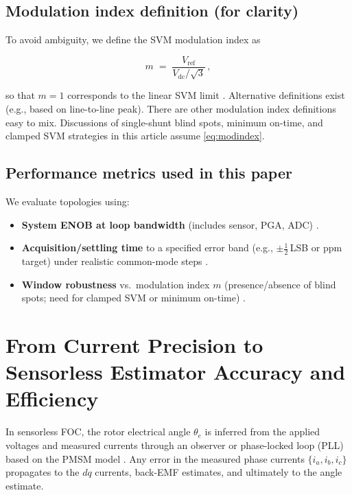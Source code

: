 \documentclass[conference]{IEEEtran}
\begin{document}
\subsection{Modulation index definition (for clarity)}

To avoid ambiguity, we define the SVM modulation index as

\begin{equation}
  m \;=\; \frac{V_{\text{ref}}}{V_{\text{dc}}/\sqrt{3}} \,,
  \label{eq:modindex}
\end{equation}

so that $m{=}1$ corresponds to the linear SVM limit \cite{VanDerBroeck1986,Bose2002}. Alternative definitions exist (e.g., based on line-to-line peak). There are other modulation index definitions easy to mix.
Discussions of single-shunt blind spots, minimum on-time, and clamped SVM strategies in this article assume \eqref{eq:modindex}.

\subsection{Performance metrics used in this paper}

We evaluate topologies using:
\begin{itemize}
  \item \textbf{System ENOB at loop bandwidth} (includes sensor, PGA, ADC) \cite{Kester2005}.
  \item \textbf{Acquisition/settling time} to a specified error band (e.g., $\pm\frac{1}{2}$\,LSB or ppm target) under realistic common-mode steps \cite{Kester2005}.
  
  \item \textbf{Window robustness} vs.\ modulation index $m$ (presence/absence of blind spots; need for clamped SVM or minimum on-time) \cite{VanDerBroeck1986,Bose2002}.

\end{itemize}


\section{From Current Precision to Sensorless Estimator Accuracy and Efficiency}
\label{sec:precision-estimator}

In sensorless FOC, the rotor electrical angle \({\theta}_e\) is inferred from the applied voltages and measured currents through an observer or phase-locked loop (PLL) based on the PMSM model \cite{Vas1998,Holtz2002,Krishnan2010}. Any error in the measured phase currents \(\{i_a,i_b,i_c\}\) propagates to the \(dq\) currents, back-EMF estimates, and ultimately to the angle estimate.
\end{document}
